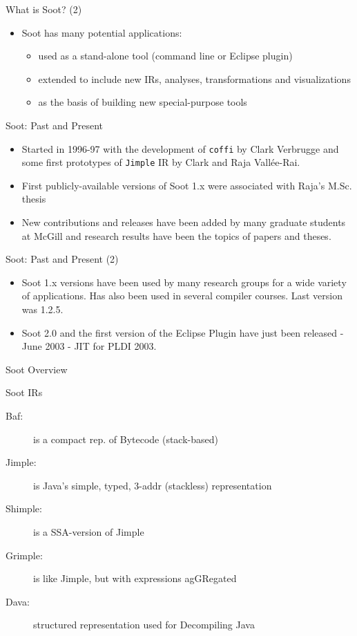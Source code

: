 \begin{slide}{What is Soot?  (2)}
\begin{itemize}
\item Soot has many potential applications:
\begin{itemize}
  \item used as a stand-alone tool (command line or Eclipse plugin)
  \item extended to include new IRs, analyses, transformations and 
        visualizations
  \item as the basis of building new special-purpose tools 
\end{itemize}
\end{itemize}
\end{slide}

\begin{slide}{Soot: Past and Present}
\begin{itemize}
\item Started in 1996-97 with the development of \texttt{coffi} by
Clark Verbrugge and some first prototypes of \texttt{Jimple} IR by
Clark and Raja Vall\'ee-Rai.
\item First publicly-available versions of Soot 1.x were associated 
with Raja's M.Sc. thesis
\item New contributions and releases have been added by many
graduate students at McGill and research results have been the topics
of papers and theses.
\end{itemize}
\end{slide}

\begin{slide}{Soot: Past and Present (2)}

\begin{itemize}
\item Soot 1.x versions have been used by many research groups for 
a wide variety of applications.   Has also been used in several
compiler courses.  Last version was 1.2.5.
\item Soot 2.0 and the first version of the Eclipse Plugin have just
been released - June 2003 - JIT for PLDI 2003.
\end{itemize}
\end{slide}

\begin{slide}{Soot Overview}
\end{slide}

\begin{slide}{Soot IRs}
\begin{description}
\item[Baf:] is a compact rep. of {\red B}ytecode (stack-based)
\item[Jimple:]  is {\red J}ava's s{\red imple}, typed,  3-addr (stackless) representation 
\item[Shimple:]  is a {\red S}SA-version of {\red Jimple}
\item[Grimple:] is like J{\red imple}, but with expressions ag{\red GR}egated 
\item[Dava:] structured representation used for {\red D}ecompiling J{\red ava}
\end{description}
\end{slide}

